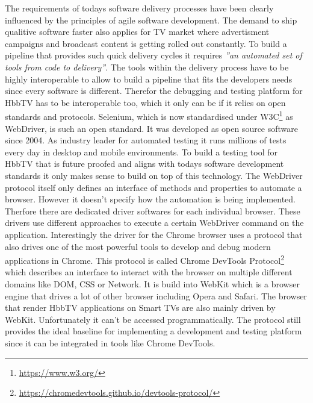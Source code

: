 The requirements of todays software delivery processes have been clearly influenced by the principles of agile software
development. The demand to ship qualitive software faster also applies for TV market where advertisment campaigns
and broadcast content is getting rolled out constantly. To build a pipeline that provides such quick delivery cycles
it requires \textit{''an automated set of tools from code to delivery''}\cite{Lehtonen2015DefiningMF}. The tools
within the delivery process have to be highly interoperable to allow to build a pipeline that fits the developers
needs since every software is different. Therefor the debugging and testing platform for HbbTV has to be interoperable
too, which it only can be if it relies on open standards and protocols. Selenium, which is now standardised under
W3C\footnote{\url{https://www.w3.org/}} as WebDriver, is such an open standard. It was developed as open source
software since 2004. As industry leader for automated testing it runs millions of tests every day in desktop and mobile
environments. To build a testing tool for HbbTV that is future proofed and aligns with todays software development
standards it only makes sense to build on top of this technology. The WebDriver protocol itself only defines an
interface of methods and properties to automate a browser. However it doesn't specify how the automation is being
implemented. Therfore there are dedicated driver softwares for each individual browser. These drivers use different
approaches to execute a certain WebDriver command on the application. Interestingly the driver for the Chrome browser
uses a protocol that also drives one of the most powerful tools to develop and debug modern applications in Chrome.
This protocol is called Chrome DevTools Protocol\footnote{\url{https://chromedevtools.github.io/devtools-protocol/}}
which describes an interface to interact with the browser on multiple different domains like DOM, CSS or Network. It
is build into WebKit which is a browser engine that drives a lot of other browser including Opera and Safari. The
browser that render HbbTV applications on Smart TVs are also mainly driven by WebKit. Unfortunately it can't be accessed
programmatically. The protocol still provides the ideal baseline for implementing a development and testing platform
since it can be integrated in tools like Chrome DevTools.

